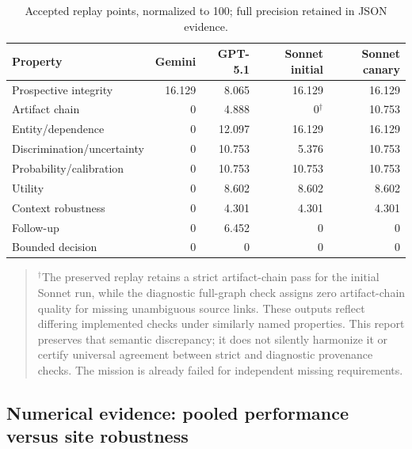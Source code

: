 \documentclass[11pt,a4paper]{article}
\newcommand{\note}[1]{\begin{quote}\small\color{Muted}#1\end{quote}}
\begin{document}
\begin{table}[H]\small
\caption{Accepted replay points, normalized to 100; full precision retained in JSON evidence.}
\begin{tabularx}{\textwidth}{@{}Yrrrr@{}}\toprule
Property & Gemini & GPT-5.1 & Sonnet initial & Sonnet canary \\\midrule
Prospective integrity & 16.129 & 8.065 & 16.129 & 16.129 \\
Artifact chain & 0 & 4.888 & 0$^\dagger$ & 10.753 \\
Entity/dependence & 0 & 12.097 & 16.129 & 16.129 \\
Discrimination/uncertainty & 0 & 10.753 & 5.376 & 10.753 \\
Probability/calibration & 0 & 10.753 & 10.753 & 10.753 \\
Utility & 0 & 8.602 & 8.602 & 8.602 \\
Context robustness & 0 & 4.301 & 4.301 & 4.301 \\
Follow-up & 0 & 6.452 & 0 & 0 \\
Bounded decision & 0 & 0 & 0 & 0 \\\bottomrule
\end{tabularx}
\end{table}

\note{$^\dagger$The preserved replay retains a strict artifact-chain pass for the initial Sonnet run, while the diagnostic full-graph check assigns zero artifact-chain quality for missing unambiguous source links. These outputs reflect differing implemented checks under similarly named properties. This report preserves that semantic discrepancy; it does not silently harmonize it or certify universal agreement between strict and diagnostic provenance checks. The mission is already failed for independent missing requirements.}

\subsection{Numerical evidence: pooled performance versus site robustness}
\end{document}
